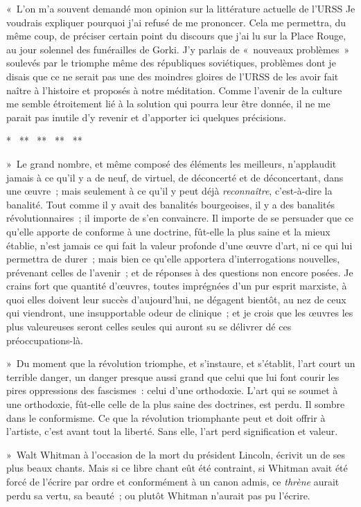 \documentclass[twoside]{book} %
\begin{document}
« L’on m’a souvent demandé mon opinion sur la littérature actuelle de l’URSS Je voudrais expliquer pourquoi j’ai refusé de me prononcer. Cela me permettra, du même coup, de préciser certain point du discours que j’ai lu sur la Place Rouge, au jour solennel des funérailles de Gorki. J’y parlais de « nouveaux problèmes » soulevés par le triomphe même des républiques soviétiques, problèmes dont je disais que ce ne serait pas une des moindres gloires de l’URSS de les avoir fait naître à l’histoire et proposés à notre méditation. Comme l’avenir de la culture me semble étroitement lié à la solution qui pourra leur être donnée, il ne me parait pas inutile d’y revenir et d’apporter ici quelques précisions.\par
{\centering \noindent **  **  **  **  **\par}
\noindent » Le grand nombre, et même composé des éléments les meilleurs, n’applaudit jamais à ce qu’il y a de neuf, de virtuel, de déconcerté et de déconcertant, dans une œuvre ; mais seulement à ce qu’il y peut déjà \emph{reconnaître}, c’est-à-dire la banalité. Tout comme il y avait des banalités bourgeoises, il y a des banalités révolutionnaires ; il importe de s’en convaincre. Il importe de se persuader que ce qu’elle apporte de conforme à une doctrine, fût-elle la plus saine et la mieux établie, n’est jamais ce qui fait la valeur profonde d’une œuvre d’art, ni ce qui lui permettra de durer ; mais bien ce qu’elle apportera d’interrogations nouvelles, prévenant celles de l’avenir ; et de réponses à des questions non encore posées. Je crains fort que quantité d’œuvres, toutes imprégnées d’un pur esprit marxiste, à quoi elles doivent leur succès d’aujourd’hui, ne dégagent bientôt, au nez de ceux qui viendront, une insupportable odeur de clinique ; et je crois que les œuvres les plus valeureuses seront celles seules qui auront su se délivrer dé ces préoccupations-là.\par
» Du moment que la révolution triomphe, et s’instaure, et s’établit, l’art court un terrible danger, un danger presque aussi grand que celui que lui font courir les pires oppressions des fascismes : celui d’une orthodoxie. L’art qui se soumet à une orthodoxie, fût-elle celle de la plus saine des doctrines, est perdu. Il sombre dans le conformisme. Ce que la révolution triomphante peut et doit offrir à l’artiste, c’est avant tout la liberté. Sans elle, l’art perd signification et valeur.\par
» Walt Whitman à l’occasion de la mort du président Lincoln, écrivit un de ses plus beaux chants. Mais si ce libre chant eût été contraint, si Whitman avait été forcé de l’écrire par ordre et conformément à un canon admis, ce \emph{thrène} aurait perdu sa vertu, sa beauté ; ou plutôt Whitman n’aurait pas pu l’écrire.\par
\end{document}
